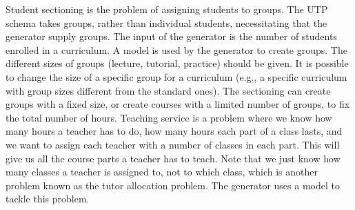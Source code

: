 


Student sectioning is the problem of assigning students to groups.
The UTP schema takes groups, rather than individual students, necessitating that the generator supply groups.
%
The input of the generator is the number of students enrolled in a curriculum.
A \CSP{} model is used by the generator to create groups.
The different sizes of groups (lecture, tutorial, practice) should be given.
It is possible to change the size of a specific group for a curriculum (e.g., a specific curriculum with group sizes different from the standard ones).
%
The sectioning \CSP{} can create groups with a fixed size, or create courses with a limited number of groups, to fix the total number of hours. 
%
Teaching service is a problem where we know how many hours a teacher has to do, how many hours each part of a class lasts, and we want to assign each teacher with a number of classes in each part.
This will give us all the course parts a teacher has to teach. %
Note that we just know how many classes a teacher is assigned to, not to which class, which is another problem
known as the tutor allocation problem.
%
The generator uses a \CSP{} model to tackle this problem.

